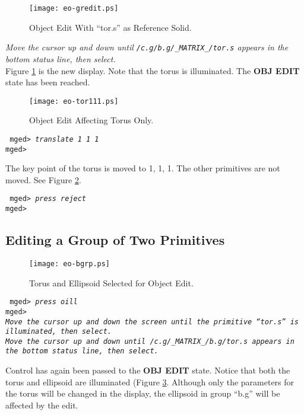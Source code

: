 \begin{figure}
\centering \texttt{[image: eo-gredit.ps]}
\caption{Object Edit With ``tor.s'' as Reference Solid.}
\label{eo-gredit}
\end{figure}

\noindent
{\em Move the cursor up and down until {\tt /c.g/b.g/\_MATRIX\_/tor.s} appears
in the bottom status line, then select.}\\

Figure \ref{eo-gredit} is the new display.  Note that the torus is
illuminated. The {\bf OBJ EDIT} state has been reached.

\begin{figure}
\centering \texttt{[image: eo-tor111.ps]}
\caption{Object Edit Affecting Torus Only.}
\label{eo-tor111}
\end{figure}

\noindent
{\tt
mged> {\em translate 1 1 1}\\
mged>\\
}

The key point of the torus is moved to 1, 1, 1.  The other primitives are
not moved.  See Figure \ref{eo-tor111}.

\noindent
{\tt
mged> {\em press reject}\\
mged>\\
}

\subsection{Editing a Group of Two Primitives}

\begin{figure}
\centering \texttt{[image: eo-bgrp.ps]}
\caption{Torus and Ellipsoid Selected for Object Edit.}
\label{eo-bgrp}
\end{figure}

\noindent
{\tt
mged> {\em press oill}\\
mged>\\
{\em Move the cursor up and down the screen until the primitive ``tor.s''
is illuminated, then select.}\\
{\em Move the cursor up and down until {\tt /c.g/\_MATRIX\_/b.g/tor.s} appears
in the bottom status line, then select.}\\
}

Control has again been passed to the {\bf OBJ EDIT} state. Notice that
both the torus and ellipsoid are illuminated (Figure \ref{eo-bgrp}.
Although only the parameters for the torus will be changed in the
display, the ellipsoid in group ``b.g'' will be affected by the edit.

